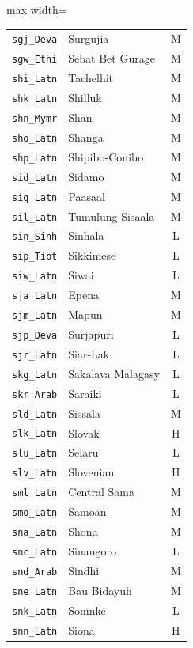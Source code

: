{\begin{adjustbox}{max width=\textwidth}
\begin{tabular}{llc}
        \texttt{sgj\_Deva} & Surgujia & M \\
        \texttt{sgw\_Ethi} & Sebat Bet Gurage & M \\
        \texttt{shi\_Latn} & Tachelhit & M \\
        \texttt{shk\_Latn} & Shilluk & M \\
        \texttt{shn\_Mymr} & Shan & M \\
        \texttt{sho\_Latn} & Shanga & M \\
        \texttt{shp\_Latn} & Shipibo-Conibo & M \\
        \texttt{sid\_Latn} & Sidamo & M \\
        \texttt{sig\_Latn} & Paasaal & M \\
        \texttt{sil\_Latn} & Tumulung Sisaala & M \\
        \texttt{sin\_Sinh} & Sinhala & L \\
        \texttt{sip\_Tibt} & Sikkimese & L \\
        \texttt{siw\_Latn} & Siwai & L \\
        \texttt{sja\_Latn} & Epena & M \\
        \texttt{sjm\_Latn} & Mapun & M \\
        \texttt{sjp\_Deva} & Surjapuri & L \\
        \texttt{sjr\_Latn} & Siar-Lak & L \\
        \texttt{skg\_Latn} & Sakalava Malagasy & L \\
        \texttt{skr\_Arab} & Saraiki & L \\
        \texttt{sld\_Latn} & Sissala & M \\
        \texttt{slk\_Latn} & Slovak & H \\
        \texttt{slu\_Latn} & Selaru & L \\
        \texttt{slv\_Latn} & Slovenian & H \\
        \texttt{sml\_Latn} & Central Sama & M \\
        \texttt{smo\_Latn} & Samoan & M \\
        \texttt{sna\_Latn} & Shona & M \\
        \texttt{snc\_Latn} & Sinaugoro & L \\
        \texttt{snd\_Arab} & Sindhi & M \\
        \texttt{sne\_Latn} & Bau Bidayuh & M \\
        \texttt{snk\_Latn} & Soninke & L \\
        \texttt{snn\_Latn} & Siona & H \\

\end{tabular}
\end{adjustbox}}
